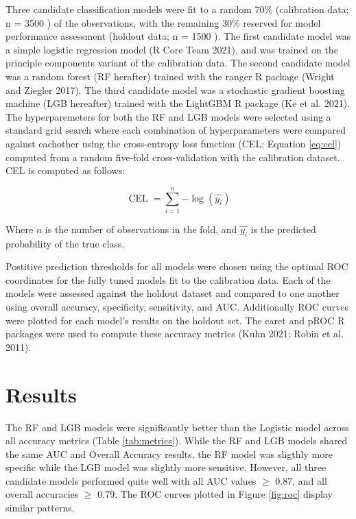 \documentclass[review]{elsarticle} %
\begin{document}
Three candidate classification models were fit to a random 70\%
(calibration data; n =
3500
)
of the observations, with the remaining 30\% reserved for model performance
assessment (holdout data; n =
1500
).
The first candidate model was a simple logistic regression model (R Core Team 2021),
and was trained on the principle components variant of the calibration data.
The second candidate model was a random forest (RF herafter) trained with
the ranger R package (Wright and Ziegler 2017).
The third candidate model was a stochastic gradient boosting machine
(LGB hereafter) trained with the LightGBM R package (Ke et al. 2021).
The hyperparemeters for both the RF and LGB models were selected using a
standard grid search where each combination of hyperparameters were compared
against eachother using the cross-entropy loss function
(CEL; Equation \eqref{eq:cel})
computed from a random five-fold cross-validation with the calibration dataset.
CEL is computed as follows:

\begin{equation}
\operatorname{CEL} = \sum_{i=1}^{n}{-\log{(\hat{y_{i}})}} \label{eq:cel}
\end{equation}

Where \(n\) is the number of observations in the fold, and \(\hat{y_i}\) is
the predicted probability of the true class.

Postitive prediction thresholds for all models were chosen using the optimal
ROC coordinates for the fully tuned models fit to the calibration data.
Each of the models were assessed against the holdout dataset and compared to one
another using overall accuracy, specificity, sensitivity, and AUC.
Additionally ROC curves were plotted for each model's results on the holdout
set.
The caret and pROC R packages were used to compute these accuracy metrics
(Kuhn 2021; Robin et al. 2011).

\hypertarget{results}{%
\section{Results}\label{results}}

The RF and LGB models were significantly better than the Logistic model
across all accuracy metrics (Table \ref{tab:metrics}).
While the RF and LGB models shared the same AUC and Overall Accuracy results,
the RF model was sligthly more specific while the LGB model was slightly more sensitive.
However, all three candidate models performed quite well with
all AUC values \(\geq\) 0.87, and all overall accuracies \(\geq\) 0.79.
The ROC curves plotted in Figure \ref{fig:roc} display similar patterns.
\end{document}

